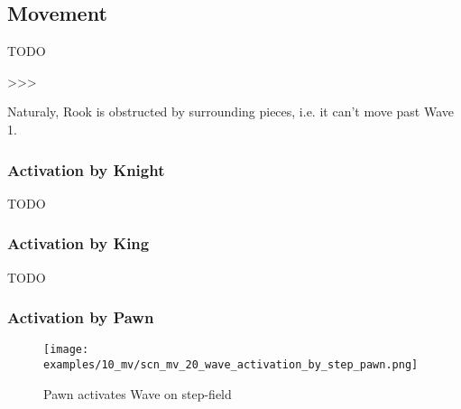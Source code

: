 \subsection*{Movement}


\huge
TODO
\normalsize

\textgreater \textgreater \textgreater

Naturaly, Rook is obstructed by surrounding pieces, i.e. it can't move past Wave 1.

\clearpage %

\subsubsection*{Activation by Knight}

\huge
TODO
\normalsize

\clearpage %

\subsubsection*{Activation by King}

\huge
TODO
\normalsize

\clearpage %

\subsubsection*{Activation by Pawn}

\vspace*{-1.4\baselineskip}
\noindent
\begin{figure}[!h]
\texttt{[image: examples/10\_mv/scn\_mv\_20\_wave\_activation\_by\_step\_pawn.png]}
\caption{Pawn activates Wave on step-field}
\label{fig:scn_mv_20_wave_activation_by_step_pawn}
\end{figure}

